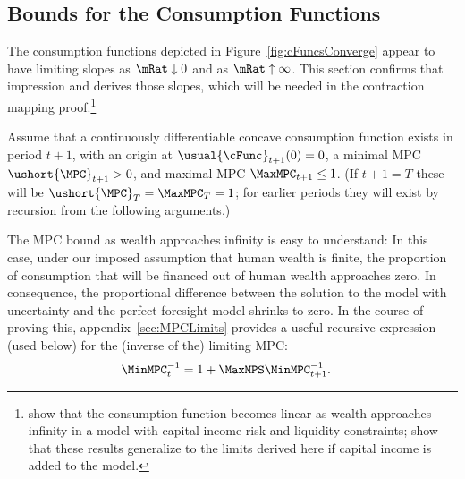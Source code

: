 \documentclass[BufferStockTheory]{subfiles}
\begin{document}
\hypertarget{Bounds-for-the-Consumption-Functions}{}
\subsection{Bounds for the Consumption Functions}\label{subsec:cFuncBounds}

The consumption functions depicted in Figure~\ref{fig:cFuncsConverge} appear
to have limiting slopes as $\mRat \downarrow 0$ and as $\mRat \uparrow
\infty$.  This section confirms that impression and derives those
slopes, which will be needed in the contraction mapping proof.\footnote{\cite{benhabibWealth} show that the consumption function
  becomes linear as wealth approaches infinity in a model with capital income risk and liquidity
  constraints; \cite{maTodaRich} show that these results generalize to the limits derived here if capital income is added to the model.}

\newcommand{\NewMaxMinMPC}{\ushort{\MPC}}

Assume that a continuously differentiable concave consumption function exists in period $t+1$, with an origin at
$\usual{\cFunc}_{t+1}(0)=0$, a minimal MPC $\NewMaxMinMPC_{t+1}>0$, and
maximal MPC $\MaxMPC_{t+1} \leq 1$.  (If $t+1 = T$ these will be
$\NewMaxMinMPC_{T}=\MaxMPC_{T}=1$; for earlier periods they will exist
by recursion from the following arguments.)

The MPC bound as wealth approaches infinity is easy to understand: In this case, under our imposed assumption that human wealth is finite, the proportion of consumption that will be financed out of human wealth approaches zero. In consequence, the proportional difference between the solution to the model with uncertainty and the perfect foresight model shrinks to zero.  \hypertarget{MPCnvrsLower}{}
In the course of proving this, appendix~\ref{sec:MPCLimits} provides a useful recursive expression (used below) for the (inverse of the) limiting MPC: \hypertarget{WRICCond}{}
\begin{align}
  \MinMPC_{t}^{-1}  & = 1+\MaxMPS \MinMPC_{t+1}^{-1} \label{eq:MinMPCInv}.
\end{align}
\end{document}
